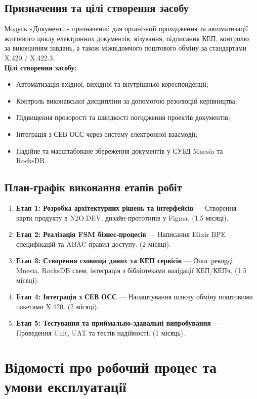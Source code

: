 \documentclass{article}
\begin{document}
\subsection{Призначення та цілі створення засобу}
Модуль «Документи» призначений для організації проходження та автоматизації життєвого циклу електронних документів, візування, підписання КЕП, контролю за виконанням завдань, а також міжвідомчого поштового обміну за стандартами X.420 / X.422.3.
\\
\textbf{Цілі створення засобу:}
\begin{itemize}
    \item Автоматизація вхідної, вихідної та внутрішньої кореспонденції;
    \item Контроль виконавської дисципліни за допомогою резолюцій керівництва;
    \item Підвищення прозорості та швидкості погодження проектів документів;
    \item Інтеграція з СЕВ ОСС через систему електронної взаємодії;
    \item Надійне та масштабоване збереження документів у СУБД Mnesia та RocksDB.
\end{itemize}

\subsection{План-графік виконання етапів робіт}
\begin{enumerate}
    \item \textbf{Етап 1: Розробка архітектурних рішень та інтерфейсів} --- Створення карти продукту в N2O.DEV, дизайн-прототипів у Figma. (1.5 місяці).
    \item \textbf{Етап 2: Реалізація FSM бізнес-процесів} --- Написання Elixir BPE специфікацій та ABAC правил доступу. (2 місяці).
    \item \textbf{Етап 3: Створення сховища даних та КЕП сервісів} --- Опис рекорді Mnesia, RocksDB схем, інтеграція з бібліотеками валідації КЕП/КЕПч. (1.5 місяці).
    \item \textbf{Етап 4: Інтеграція з СЕВ ОСС} --- Налаштування шлюзу обміну поштовими пакетами X.420. (2 місяці).
    \item \textbf{Етап 5: Тестування та приймально-здавальні випробування} --- Проведення Unit, UAT та тестів надійності. (1 місяць).
\end{enumerate}

\newpage
\section{Відомості про робочий процес та умови експлуатації}
\end{document}
